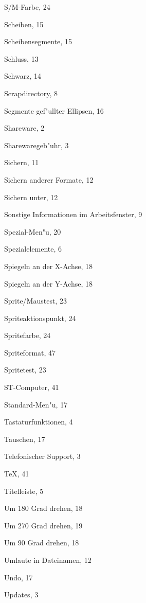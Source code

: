 \begin{theindex}
  \indexspace

  \item S/M-Farbe, 24
  \item Scheiben, 15
  \item Scheibensegmente, 15
  \item Schluss, 13
  \item Schwarz, 14
  \item Scrapdirectory, 8
  \item Segmente gef"ullter Ellipsen, 16
  \item Shareware, 2
  \item Sharewaregeb"uhr, 3
  \item Sichern, 11
  \item Sichern anderer Formate, 12
  \item Sichern unter, 12
  \item Sonstige Informationen im Arbeitsfenster, 9
  \item Spezial-Men"u, 20
  \item Spezialelemente, 6
  \item Spiegeln an der X-Achse, 18
  \item Spiegeln an der Y-Achse, 18
  \item Sprite/Maustest, 23
  \item Spriteaktionspunkt, 24
  \item Spritefarbe, 24
  \item Spriteformat, 47
  \item Spritetest, 23
  \item ST-Computer, 41
  \item Standard-Men"u, 17

  \indexspace

  \item Tastaturfunktionen, 4
  \item Tauschen, 17
  \item Telefonischer Support, 3
  \item \TeX, 41
  \item Titelleiste, 5

  \indexspace

  \item Um 180 Grad drehen, 18
  \item Um 270 Grad drehen, 19
  \item Um 90 Grad drehen, 18
  \item Umlaute in Dateinamen, 12
  \item Undo, 17
  \item Updates, 3


\end{theindex}
